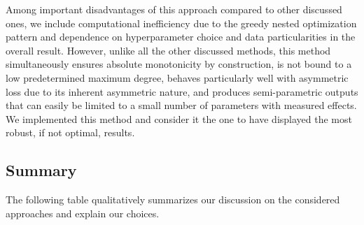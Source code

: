 \documentclass[12pt,a4paper]{article}
\begin{document}
Among important disadvantages of this approach compared to other discussed ones, we include computational inefficiency due to the greedy nested optimization pattern and dependence on hyperparameter choice and data particularities in the overall result. However, unlike all the other discussed methods, this method simultaneously ensures absolute monotonicity by construction, is not bound to a low predetermined maximum degree, behaves particularly well with asymmetric loss due to its inherent asymmetric nature, and produces semi-parametric outputs that can easily be limited to a small number of parameters with measured effects.\\

We implemented this method and consider it the one to have displayed the most robust, if not optimal, results.

\subsection{Summary}
\label{summary_approaches}

The following table qualitatively summarizes our discussion on the considered approaches and explain our choices.
\end{document}
